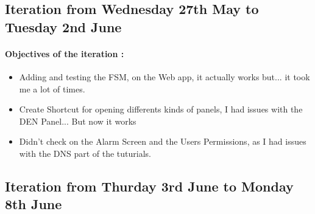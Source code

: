 \documentclass[a4paper, 12pt]{article}
\begin{document}
\begin{appendix}
    \subsection{Iteration from Wednesday 27th May to Tuesday 2nd June}
    \paragraph{Objectives of the iteration :}
    \begin{itemize}
        \item Adding and testing the FSM, on the Web app, it actually works but... it took me a lot of times.
        \item Create Shortcut for opening differents kinds of panels, I had issues with the DEN Panel... But now it works
        \item Didn't check on the Alarm Screen and the Users Permissions, as I had issues with the DNS part of the tuturials.
    \end{itemize}

    \subsection{Iteration from Thurday 3rd June to Monday 8th June}

\end{appendix}
\end{document}
